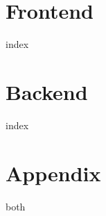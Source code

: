 


    \def\mode{both}
    \def\version{October 20, 2021}
    \def\booktitle{\huge\bfseries 2021 Web Application Essentials}
    
    \part{Frontend}\label{part:frontend}
    {index}
    \part{Backend}\label{part:backend}
    {index}
    \appendix
    \part{Appendix}\label{part:appendix}
    {\mode}


